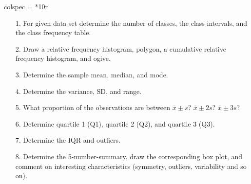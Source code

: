 \documentclass[letterpaper,12pt]{article}
\begin{document}
\begin{enumerate}
\begin{center}
\begin{longtblr}{colspec = *{10}r}
      \end{longtblr}
    \end{center}
    \begin{enumerate}
      \item[1.]
        For given data set determine the number of classes, the class intervals, and the class frequency table.
      \item[2.]
        Draw a relative frequency histogram, polygon, a cumulative relative frequency histogram, and ogive.
      \item[3.]
        Determine the sample mean, median, and mode.
      \item[4.]
        Determine the variance, SD, and range.
      \item[5.]
        What proportion of the observations are between $\bar{x} \pm s$? $\bar{x} \pm 2s$? $\bar{x} \pm 3s$?
      \item[6.]
        Determine quartile 1 (Q1), quartile 2 (Q2), and quartile 3 (Q3).
      \item[7.]
        Determine the IQR and outliers.
      \item[8.]
        Determine the 5-number-summary, draw the corresponding box plot, and comment on interesting characteristics (symmetry, outliers, variability and so on).
    \end{enumerate}
\end{enumerate}
\end{document}
